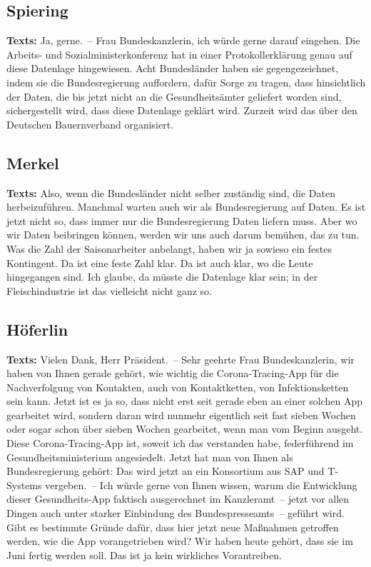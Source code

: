 \documentclass{article}
\begin{document}
\subsection{Spiering}
\noindent\textbf{Texts:} Ja, gerne. – Frau Bundeskanzlerin, ich würde gerne darauf eingehen. Die Arbeits- und Sozialministerkonferenz hat in einer Protokollerklärung genau auf diese Datenlage hingewiesen. Acht Bundesländer haben sie gegengezeichnet, indem sie die Bundesregierung auffordern, dafür Sorge zu tragen, dass hinsichtlich der Daten, die bis jetzt nicht an die Gesundheitsämter geliefert worden sind, sichergestellt wird, dass diese Datenlage geklärt wird. Zurzeit wird das über den Deutschen Bauernverband organisiert.

\subsection{Merkel}
\noindent\textbf{Texts:} Also, wenn die Bundesländer nicht selber zuständig sind, die Daten herbeizuführen. Manchmal warten auch wir als Bundesregierung auf Daten. Es ist jetzt nicht so, dass immer nur die Bundesregierung Daten liefern muss. Aber wo wir Daten beibringen können, werden wir uns auch darum bemühen, das zu tun. Was die Zahl der Saisonarbeiter anbelangt, haben wir ja sowieso ein festes Kontingent. Da ist eine feste Zahl klar. Da ist auch klar, wo die Leute hingegangen sind. Ich glaube, da müsste die Datenlage klar sein; in der Fleischindustrie ist das vielleicht nicht ganz so.

\subsection{Höferlin}
\noindent\textbf{Texts:} Vielen Dank, Herr Präsident. – Sehr geehrte Frau Bundeskanzlerin, wir haben von Ihnen gerade gehört, wie wichtig die Corona-Tracing-App für die Nachverfolgung von Kontakten, auch von Kontaktketten, von Infektionsketten sein kann. Jetzt ist es ja so, dass nicht erst seit gerade eben an einer solchen App gearbeitet wird, sondern daran wird nunmehr eigentlich seit fast sieben Wochen oder sogar schon über sieben Wochen gearbeitet, wenn man vom Beginn ausgeht. Diese Corona-Tracing-App ist, soweit ich das verstanden habe, federführend im Gesundheitsministerium angesiedelt. Jetzt hat man von Ihnen als Bundesregierung gehört: Das wird jetzt an ein Konsortium aus SAP und T-Systems vergeben. – Ich würde gerne von Ihnen wissen, warum die Entwicklung dieser Gesundheits-App faktisch ausgerechnet im Kanzleramt – jetzt vor allen Dingen auch unter starker Einbindung des Bundespresseamts – geführt wird. Gibt es bestimmte Gründe dafür, dass hier jetzt neue Maßnahmen getroffen werden, wie die App vorangetrieben wird? Wir haben heute gehört, dass sie im Juni fertig werden soll. Das ist ja kein wirkliches Vorantreiben.
\end{document}
